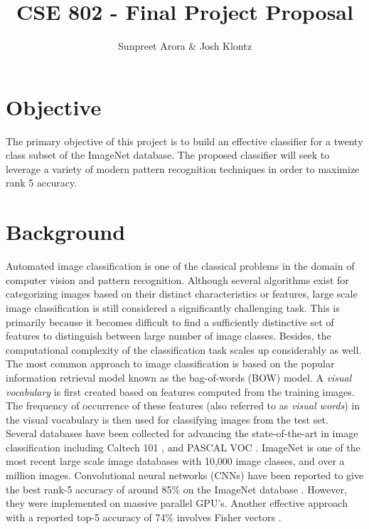 \documentclass[12pt]{article}
\begin{document}
 
\title{CSE 802 - Final Project Proposal}
\author{Sunpreet Arora \& Josh Klontz\\
}
 
\maketitle

\section{Objective}
The primary objective of this project is to build an effective classifier for a twenty class subset of the ImageNet \cite{imagenet} database. The proposed classifier will seek to leverage a variety of modern pattern recognition techniques in order to maximize rank 5 accuracy.

\section{Background}
Automated image classification is one of the classical problems in the domain of computer vision and pattern recognition. Although several algorithms exist for categorizing images based on their distinct characteristics or features, large scale image classification is still considered a significantly challenging task. This is primarily because it becomes difficult to find a sufficiently distinctive set of features to distinguish between large number of image classes. Besides, the computational complexity of the classification task scales up considerably as well.\\
The most common approach to image classification is based on the popular information retrieval model known as the bag-of-words (BOW) model. A \textit{visual vocabulary} is first created based on features computed from the training images. The frequency of occurrence of these features (also referred to as \textit{visual words}) in the visual vocabulary is then used for classifying images from the test set.\\
Several databases have been collected for advancing the state-of-the-art in image classification including Caltech 101 \cite{caltech101}, and PASCAL VOC \cite{pascal09}. ImageNet \cite{imagenet} is one of the most recent large scale image databases with 10,000 image classes, and over a million images. Convolutional neural networks (CNNs) have been reported to give the best rank-5 accuracy of around 85\% on the ImageNet database \cite{alex2012}. However, they were implemented on massive parallel GPU's. Another effective approach with a reported top-5 accuracy of 74\% involves Fisher vectors \cite{csurka2011fisher}.
\end{document}
